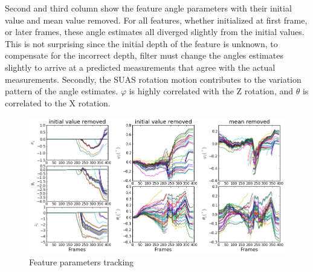 Second and third column show the feature angle parameters with their
initial value and mean value removed. For all features, whether
initialized at first frame, or later frames, these angle estimates all
diverged slightly from the initial values. This is not surprising
since the initial depth of the feature is unknown, to compensate for
the incorrect depth, filter must change the angles estimates slightly
to arrive at a predicted measurements that agree with the actual
measurements. Secondly, the SUAS rotation motion contributes to the
variation pattern of the angle estimates. $\varphi$ is highly
correlated with the Z rotation, and $\theta$ is correlated to the X
rotation. 

\begin{figure}[h]
\centering
\includegraphics[width=14cm, keepaspectratio=true]
{./Figures/fltfig/cut1/Figure20.png}
\caption{Feature parameters tracking}
\label{fltfig:2}
\end{figure}


\FloatBarrier


